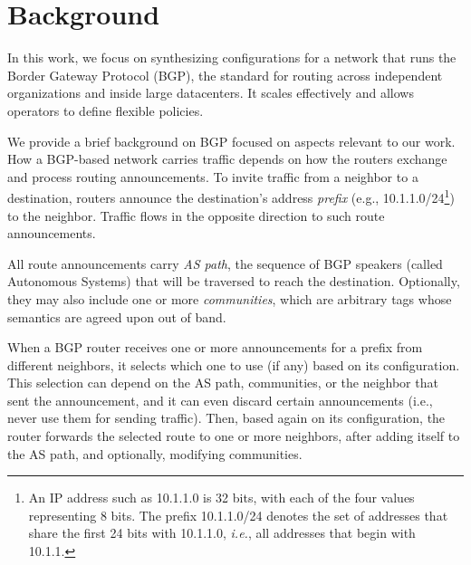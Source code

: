 \documentclass[numbers, 10pt, preprint]{sigplanconf}
\newcommand{\IE}{\emph{i.e.}}
\begin{document}

%
%
%
%

\section{Background}
\label{sec:background}

In this work, we focus on synthesizing configurations for a network that runs the Border Gateway Protocol (BGP), the standard for routing across independent organizations and inside large datacenters. It scales effectively and allows operators to define flexible policies. 

We provide a brief background on BGP focused on aspects relevant to our work. How a BGP-based network carries traffic depends on how the routers exchange and process routing announcements. To invite traffic from a neighbor to a destination, routers announce the destination's address {\em prefix} (e.g., 10.1.1.0/24\footnote{An IP address
such as 10.1.1.0 is 32 bits, with each of the four values representing 8 bits. The prefix 10.1.1.0/24 denotes the set of addresses that share the first 24 bits with 10.1.1.0, \IE, all addresses that begin with 10.1.1.}) to the neighbor. Traffic flows in the opposite direction to such route announcements.

All route announcements carry {\em AS path}, the sequence of BGP speakers (called Autonomous Systems) that will be traversed to reach the destination.
Optionally, they may also include one or more {\em communities}, which are arbitrary tags whose semantics are agreed upon out of band.

When a BGP router receives one or more announcements for a prefix from different neighbors, it selects which one to use (if any) based on its configuration. This selection can depend on the AS path, communities, or the neighbor that sent the announcement, and it can even discard certain announcements (i.e., never use them for sending traffic). Then, based again on its configuration, the router forwards the selected route to one or more neighbors, after adding itself to the AS path, and optionally, modifying communities.
\end{document}
